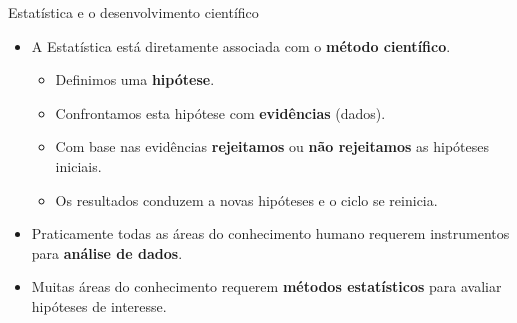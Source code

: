 \documentclass[
  ignorenonframetext,
  serif,
  professionalfont,
  usenames,
  dvipsnames,
  aspectratio = 169]{beamer}
\providecommand{\tightlist}{%
  \setlength{\itemsep}{0pt}\setlength{\parskip}{0pt}}
\renewcommand{\tightlist}{%
  \setlength{\itemsep}{0\baselineskip}
  \setlength{\parskip}{0.25\baselineskip}
}
\begin{document}
\begin{frame}{Estatística e o desenvolvimento científico}
\protect\hypertarget{estatuxedstica-e-o-desenvolvimento-cientuxedfico}{}
\begin{itemize}
\item
  A Estatística está diretamente associada com o
  \textbf{método científico}.

  \begin{itemize}
  \tightlist
  \item
    Definimos uma \textbf{hipótese}.
  \item
    Confrontamos esta hipótese com \textbf{evidências} (dados).
  \item
    Com base nas evidências \textbf{rejeitamos} ou
    \textbf{não rejeitamos} as hipóteses iniciais.
  \item
    Os resultados conduzem a novas hipóteses e o ciclo se reinicia.
  \end{itemize}
\item
  Praticamente todas as áreas do conhecimento humano requerem
  instrumentos para \textbf{análise de dados}.
\item
  Muitas áreas do conhecimento requerem \textbf{métodos estatísticos}
  para avaliar hipóteses de interesse.
\end{itemize}
\end{frame}
\end{document}
